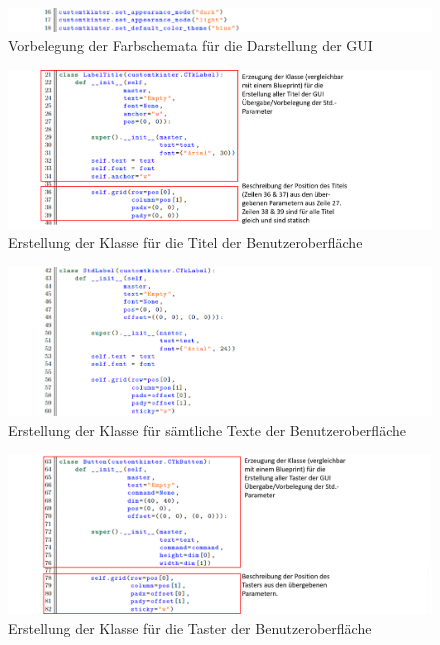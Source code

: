 \begin{appendix}
\begin{landscape}
\begin{figure}[H]
    \centering
    \includegraphics[scale=0.85]{98_images/src/fhnw_pro6m_quellcode_02.png}
    \caption*{Vorbelegung der Farbschemata für die Darstellung der GUI}
    \label{fig:fhnw_pro6m_quellcode_02}
\end{figure}

\begin{figure}[H]
    \centering
    \includegraphics[scale=0.85]{98_images/src/fhnw_pro6m_quellcode_03.png}
    \caption*{Erstellung der Klasse für die Titel der Benutzeroberfläche}
    \label{fig:fhnw_pro6m_quellcode_03}
\end{figure}

\begin{figure}[H]
    \centering
    \includegraphics[scale=0.85]{98_images/src/fhnw_pro6m_quellcode_04.png}
    \caption*{Erstellung der Klasse für sämtliche Texte der Benutzeroberfläche}
    \label{fig:fhnw_pro6m_quellcode_04}
\end{figure}

\begin{figure}[H]
    \centering
    \includegraphics[scale=0.85]{98_images/src/fhnw_pro6m_quellcode_05.png}
    \caption{Erstellung der Klasse für die Taster der Benutzeroberfläche}
    \label{fig:fhnw_pro6m_quellcode_05}
\end{figure}


\end{landscape}
\end{appendix}
